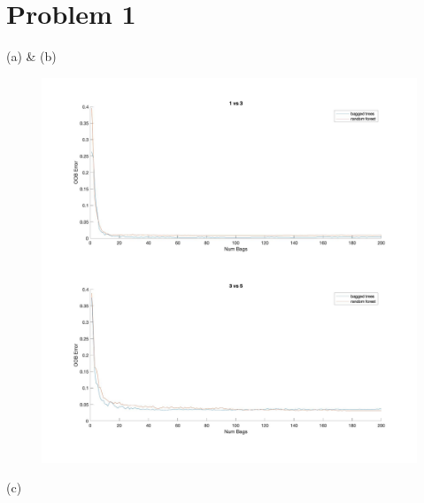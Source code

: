 \documentclass[12pt,letterpaper]{article}
\begin{document}
\section*{Problem 1}

\begin{description}
	\item (a) \& (b)

\begin{figure}[H]
\centering
\includegraphics[scale=0.28]{image.jpg} 
\end{figure}

	\item (c)

\end{description}
\end{document}
